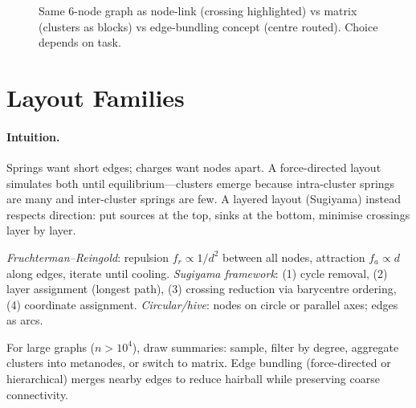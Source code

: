 \begin{figure}[h]
\caption{Same 6-node graph as node-link (crossing highlighted) vs matrix (clusters as blocks) vs edge-bundling concept (centre routed). Choice depends on task.}
\label{fig:node-matrix}
\end{figure}

\section{Layout Families}
\label{sec:layouts}
\paragraph{Intuition.} Springs want short edges; charges want nodes apart. A force-directed layout simulates both until equilibrium---clusters emerge because intra-cluster springs are many and inter-cluster springs are few. A layered layout (Sugiyama) instead respects direction: put sources at the top, sinks at the bottom, minimise crossings layer by layer.

\begin{definition}\label{def:layout-families}
\emph{Fruchterman--Reingold}: repulsion $f_r\propto 1/d^2$ between all nodes, attraction $f_a\propto d$ along edges, iterate until cooling. \emph{Sugiyama framework}: (1) cycle removal, (2) layer assignment (longest path), (3) crossing reduction via barycentre ordering, (4) coordinate assignment. \emph{Circular/hive}: nodes on circle or parallel axes; edges as arcs.
\end{definition}

For large graphs ($n>10^4$), draw summaries: sample, filter by degree, aggregate clusters into metanodes, or switch to matrix. Edge bundling (force-directed or hierarchical) merges nearby edges to reduce hairball while preserving coarse connectivity.

